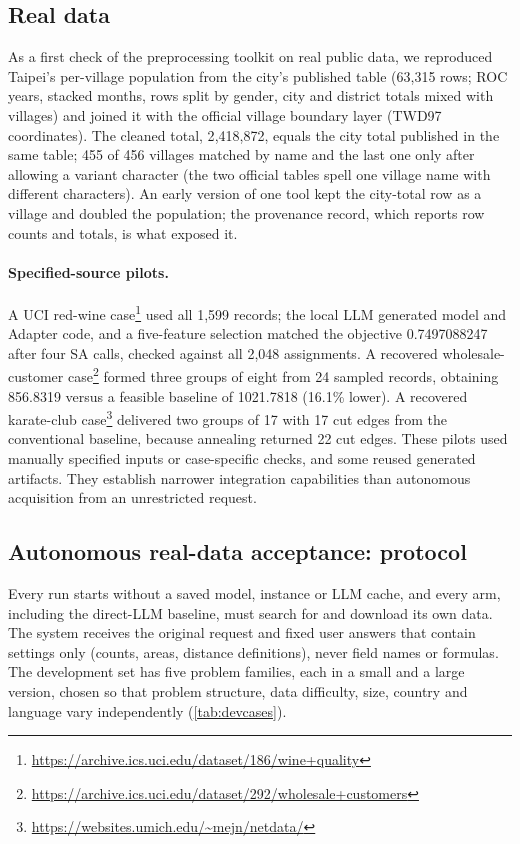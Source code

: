 \subsection{Real data}
\label{sec:realdata}
As a first check of the preprocessing toolkit on real public data, we reproduced Taipei's per-village population
from the city's published table (63{,}315 rows; ROC years, stacked months, rows split by gender, city and
district totals mixed with villages) and joined it with the official village boundary layer (TWD97 coordinates).
The cleaned total, 2{,}418{,}872, equals the city total published in the same table; 455 of 456 villages matched
by name and the last one only after allowing a variant character (the two official tables spell one village name with different characters).
An early version of one tool kept the city-total row as a village and doubled the population; the provenance
record, which reports row counts and totals, is what exposed it.


\paragraph{Specified-source pilots.}
A UCI red-wine case\footnote{\url{https://archive.ics.uci.edu/dataset/186/wine+quality}} used all 1,599 records;
the local LLM generated model and Adapter code, and a five-feature selection matched the objective
0.7497088247 after four SA calls, checked against all 2,048 assignments. A recovered wholesale-customer
case\footnote{\url{https://archive.ics.uci.edu/dataset/292/wholesale+customers}} formed three groups of eight
from 24 sampled records, obtaining 856.8319 versus a feasible baseline of 1021.7818 (16.1\% lower).
A recovered karate-club case\footnote{\url{https://websites.umich.edu/~mejn/netdata/}} delivered two groups
of 17 with 17 cut edges from the conventional baseline, because annealing returned 22 cut edges.
These pilots used manually specified inputs or case-specific checks, and some reused generated artifacts.
They establish narrower integration capabilities than autonomous acquisition from an unrestricted request.

\subsection{Autonomous real-data acceptance: protocol}
\label{sec:autonomousprotocol}
Every run starts without a saved model, instance or LLM cache, and every arm, including the direct-LLM baseline,
must search for and download its own data. The system receives the original request and fixed user answers that
contain settings only (counts, areas, distance definitions), never field names or formulas. The development set
has five problem families, each in a small and a large version, chosen so that problem structure, data
difficulty, size, country and language vary independently (\cref{tab:devcases}).

